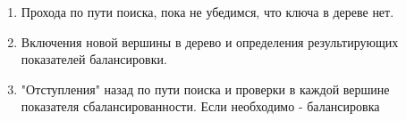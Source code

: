 \begin{enumerate}
    \item Прохода по пути поиска, пока не убедимся, что ключа в дереве нет.
    \item Включения новой вершины в дерево и определения результирующих показателей балансировки.
    \item "Отступления" назад по пути поиска и проверки в каждой вершине показателя сбалансированности.
    Если необходимо - балансировка
\end{enumerate}
